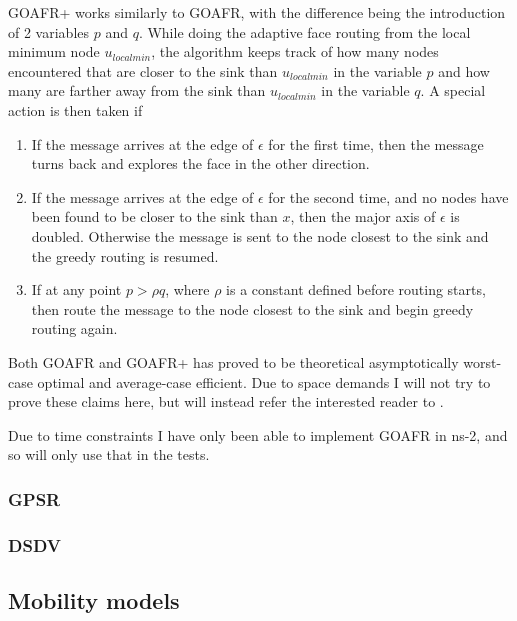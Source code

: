 GOAFR+ works similarly to GOAFR, with the difference being the introduction of 2 variables $p$ and $q$. While doing the adaptive face routing from the local minimum node $u_{local min}$, the algorithm keeps track of how many nodes encountered that are closer to the sink than $u_{local min}$ in the variable $p$ and how many are farther away from the sink than $u_{local min}$ in the variable $q$.
A special action is then taken if
\begin{enumerate}
\item If the message arrives at the edge of $\epsilon$ for the first time, then the message turns back and explores the face in the other direction. 
\item If the message arrives at the edge of $\epsilon$ for the second time, and no nodes have been found to be closer to the sink than $x$, then the major axis of $\epsilon$ is doubled. Otherwise the message is sent to the node closest to the sink and the greedy routing is resumed.
\item If at any point $p > \rho q$, where $\rho$ is a constant defined before routing starts, then route the message to the node closest to the sink and begin greedy routing again.
\end{enumerate}

Both GOAFR and GOAFR+ has proved to be theoretical asymptotically worst-case optimal and average-case efficient. Due to space demands I will not try to prove these claims here, but will instead refer the interested reader to \cite{gopher+, gopher}.

Due to time constraints I have only been able to implement GOAFR in ns-2, and so will only use that in the tests.

\subsubsection{GPSR}



\subsubsection{DSDV}

\subsubsection{}

\subsection{Mobility models}


